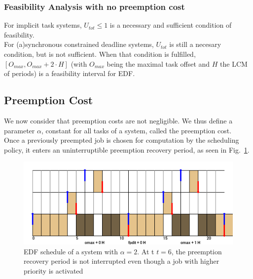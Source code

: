 \documentclass[a4paper,10pt]{article}
\begin{document}
        \subsubsection{Feasibility Analysis with no preemption cost}


        For implicit task systems, $U_{tot} \leqslant 1$ is a necessary and sufficient condition of feasibility.\\

        For (a)synchronous constrained deadline systems, $U_{tot}$ is still a necesary condition, but is not sufficient. When that condition is fulfilled, $[O_{max}, O_{max} + 2 \cdot H]$ (with $O_{max}$ being the maximal task offset and $H$ the LCM of periods) is a feasibility interval for EDF.

    \subsection{Preemption Cost}


        We now consider that preemption costs are not negligible. We thus define a parameter $\alpha$, constant for all tasks of a system, called the preemption cost.\\

        Once a previously preempted job is chosen for computation by the scheduling policy, it enters an uninterruptible preemption recovery period, as seen in Fig.~\ref{fig:prp}.\\

        \begin{figure}[H]
        \begin{center}
            \includegraphics[width=\textwidth]{figs/atomicpreemption_example.png}
            \caption{EDF schedule of a system with $\alpha=2$. At t $t=6$, the preemption recovery period is not interrupted even though a job with higher priority is activated}
            \label{fig:prp}
        \end{center}
        \end{figure}
\end{document}
